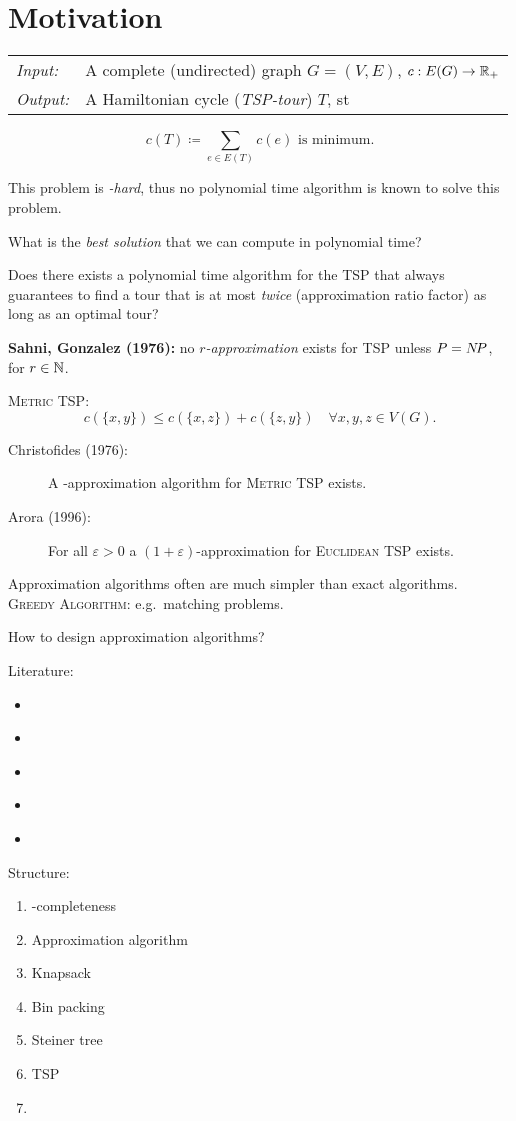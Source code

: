 \documentclass[../skript.tex]{subfiles}
\begin{document}
\addtocounter{chapter}{-1}
\chapter{Motivation}
\begin{problem}
\begin{tabular}{@{}ll}
\textit{Input:} & A complete (undirected) graph $G = (V, E)$, $c : E(G) \to \mathbb{R}_+$ \\
\textit{Output:} & A Hamiltonian cycle (\emph{TSP-tour}) $T$, \ac{st}
\end{tabular}
\[
	c(T) \coloneqq \sum_{e \in E(T)} c(e) \text{ is minimum.}
\]
\end{problem}
This problem is \emph{\NP-hard}, thus no polynomial time algorithm is known to solve this problem.

What is the \textit{best solution} that we can compute in polynomial time?

Does there exists a polynomial time algorithm for the \textsc{TSP} that always guarantees to find a tour that is at most \textit{twice} (approximation ratio factor) as long as an optimal tour?

\textbf{Sahni, Gonzalez (1976):} no \emph{$r$-approximation} exists for \textsc{TSP} unless $P = N \! P$, for $r \in \mathbb{N}$.

\textsc{Metric TSP}:
\[
	c(\{x, y\}) \leq c(\{ x, z \}) + c(\{z, y\}) \quad \forall x, y, z \in V(G).
\]
\begin{description}
\item[Christofides (1976):] A -approximation algorithm for \textsc{Metric TSP} exists.
\item[Arora (1996):] For all $\varepsilon > 0$ a $(1 + \varepsilon)$-approximation for \textsc{Euclidean TSP} exists.
\end{description}

Approximation algorithms often are much simpler than exact algorithms. \\
\textsc{Greedy Algorithm}: e.g.\ matching problems.

How to design approximation algorithms?

Literature: 
\begin{itemize}
\item \cite[Chapters 15-18, 20, 21]{KorteVygen}
\item \cite{CormenLeiserson}
\item \cite{GareyJohnson}
\item \cite{Vazirani}
\item \cite{JansenMargraf}
\end{itemize}
Structure:
\begin{enumerate}
\item \NP-completeness
\item Approximation algorithm
\item Knapsack
\item Bin packing
\item Steiner tree
\item \textsc{TSP}
\item \PCP
\end{enumerate}
\end{document}
